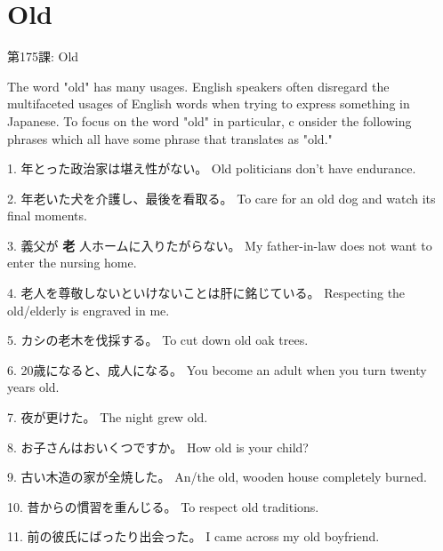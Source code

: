     
\chapter{Old}

\begin{center}
\begin{Large}
第175課: Old 
\end{Large}
\end{center}
 
\par{ The word "old" has many usages. English speakers often disregard the multifaceted usages of English words when trying to express something in Japanese. To focus on the word "old" in particular, c onsider the following phrases which all have some phrase that translates as "old." }

\par{1. 年とった政治家は堪え性がない。 \hfill\break
Old politicians don't have endurance. }

\par{2. 年老いた犬を介護し、最後を看取る。 \hfill\break
To care for an old dog and watch its final moments. }

\par{3. 義父が \textbf{老 }人ホームに入りたがらない。 \hfill\break
My father-in-law does not want to enter the nursing home. }

\par{4. 老人を尊敬しないといけないことは肝に銘じている。 \hfill\break
Respecting the old\slash elderly is engraved in me. }

\par{5. カシの老木を伐採する。 \hfill\break
To cut down old oak trees. }

\par{6. 20歳になると、成人になる。 \hfill\break
You become an adult when you turn twenty years old. }

\par{7. 夜が更けた。 \hfill\break
The night grew old. }

\par{8. お子さんはおいくつですか。 \hfill\break
How old is your child? }

\par{9. 古い木造の家が全焼した。 \hfill\break
An\slash the old, wooden house completely burned. }

\par{10. 昔からの慣習を重んじる。 \hfill\break
To respect old traditions. }

\par{11. 前の彼氏にばったり出会った。 \hfill\break
I came across my old boyfriend. }
      
